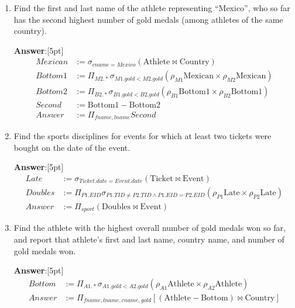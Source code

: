 \documentclass{article}
\begin{document}
\begin{enumerate}
\item   %
Find the first and last name of the athlete representing ``Mexico'', who so far
has the second highest number of gold medals (among athletes of the same country).

{\bf Answer}:[5pt]
\begin{equation*}
\begin{aligned}
Mexican & := \sigma_{cname=Mexico} (\mathrm{Athlete} \bowtie \mathrm{Country}) \\
Bottom1 & := \Pi_{M2.*} \sigma_{M1.gold < M2.gold} (\rho_{M1} \mathrm{Mexican} \times \rho_{M2} \mathrm{Mexican}) \\
Bottom2 & := \Pi_{B2.*} \sigma_{B1.gold < B2.gold} (\rho_{B1} \mathrm{Bottom1} \times \rho_{B2} \mathrm{Bottom1}) \\
Second & := \mathrm{Bottom1} - \mathrm{Bottom2} \\
Answer & := \Pi_{fname, lname} Second
\end{aligned}
\end{equation*}


\item   %
Find the sports disciplines for events for which at least two tickets
were bought on the date of the event.

{\bf Answer}:[5pt]
\begin{equation*}
\begin{aligned}
Late & := \sigma_{Ticket.date=Event.date} (\mathrm{Ticket} \bowtie \mathrm{Event}) \\
Doubles & := \Pi_{P1.EID} \sigma_{P1.TID \neq P2.TID \land P1.EID = P2.EID} (\rho_{P1} \mathrm{Late} \times \rho_{P2} \mathrm{Late}) \\
Answer & := \Pi_{sport} (\mathrm{Doubles} \bowtie \mathrm{Event})
\end{aligned}
\end{equation*}

\item   %
Find the athlete with the highest overall number of gold medals won so far, and report that athlete's first and last name, country name, and number of gold medals won.

{\bf Answer}:[5pt]
\begin{equation*}
\begin{aligned}
Bottom & := \Pi_{A1.*} \sigma_{A1.gold < A2.gold} (\rho_{A1} \mathrm{Athlete} \times \rho_{A2} \mathrm{Athlete}) \\
Answer & := \Pi_{fname, lname, cname, gold} [(\mathrm{Athlete} - \mathrm{Bottom}) \bowtie \mathrm{Country}]
\end{aligned}
\end{equation*}


\end{enumerate}
\end{document}
